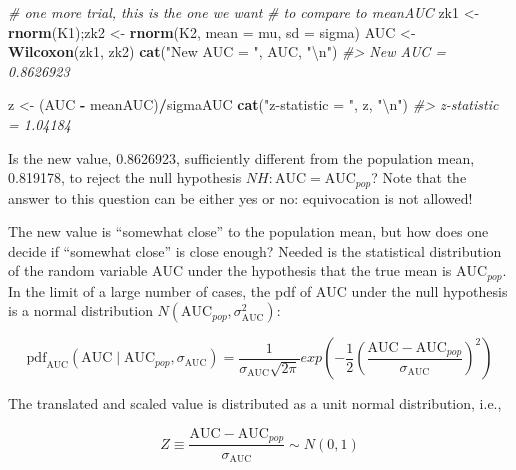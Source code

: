\documentclass[
]{book}
\newenvironment{Shaded}{\begin{snugshade}}{\end{snugshade}}
\newcommand{\CharTok}[1]{\textcolor[rgb]{0.31,0.60,0.02}{#1}}
\newcommand{\CommentTok}[1]{\textcolor[rgb]{0.56,0.35,0.01}{\textit{#1}}}
\newcommand{\DataTypeTok}[1]{\textcolor[rgb]{0.13,0.29,0.53}{#1}}
\newcommand{\KeywordTok}[1]{\textcolor[rgb]{0.13,0.29,0.53}{\textbf{#1}}}
\newcommand{\NormalTok}[1]{#1}
\newcommand{\OperatorTok}[1]{\textcolor[rgb]{0.81,0.36,0.00}{\textbf{#1}}}
\newcommand{\StringTok}[1]{\textcolor[rgb]{0.31,0.60,0.02}{#1}}
\begin{document}
\begin{Shaded}
\begin{Highlighting}[]
\CommentTok{# one more trial, this is the one we want }
\CommentTok{# to compare to meanAUC}
\NormalTok{zk1 <-}\StringTok{ }\KeywordTok{rnorm}\NormalTok{(K1);zk2 <-}\StringTok{ }\KeywordTok{rnorm}\NormalTok{(K2, }\DataTypeTok{mean =}\NormalTok{ mu, }\DataTypeTok{sd =}\NormalTok{ sigma) }
\NormalTok{AUC <-}\StringTok{ }\KeywordTok{Wilcoxon}\NormalTok{(zk1, zk2)}
\KeywordTok{cat}\NormalTok{(}\StringTok{"New AUC = "}\NormalTok{, AUC, }\StringTok{"}\CharTok{\textbackslash{}n}\StringTok{"}\NormalTok{)}
\CommentTok{#> New AUC =  0.8626923}

\NormalTok{z <-}\StringTok{ }\NormalTok{(AUC }\OperatorTok{-}\StringTok{ }\NormalTok{meanAUC)}\OperatorTok{/}\NormalTok{sigmaAUC}
\KeywordTok{cat}\NormalTok{(}\StringTok{"z-statistic = "}\NormalTok{, z, }\StringTok{"}\CharTok{\textbackslash{}n}\StringTok{"}\NormalTok{)}
\CommentTok{#> z-statistic =  1.04184}
\end{Highlighting}
\end{Shaded}

Is the new value, 0.8626923, sufficiently different from the population mean, 0.819178, to reject the null hypothesis \(NH: \text{AUC} = \text{AUC}_{pop}\)? Note that the answer to this question can be either yes or no: equivocation is not allowed!

The new value is ``somewhat close'' to the population mean, but how does one decide if ``somewhat close'' is close enough? Needed is the statistical distribution of the random variable \(\text{AUC}\) under the hypothesis that the true mean is \(\text{AUC}_{pop}\). In the limit of a large number of cases, the pdf of \(\text{AUC}\) under the null hypothesis is a normal distribution \(N\left ( \text{AUC}_{pop}, \sigma_{\text{AUC}}^{2} \right )\):

\begin{equation*} 
\text{pdf}_{\text{AUC}}\left ( \text{AUC}\mid \text{AUC}_{pop}, \sigma_{\text{AUC}} \right )=\frac{1}{\sigma_{\text{AUC}}\sqrt{2\pi}}exp\left ( -\frac{1}{2} \left ( \frac{\text{AUC}-\text{AUC}_{pop}}{\sigma_{\text{AUC}}} \right )^2\right )
\end{equation*}

The translated and scaled value is distributed as a unit normal distribution, i.e.,

\begin{equation*} 
Z \equiv \frac{\text{AUC}-\text{AUC}_{pop}}{\sigma_{\text{AUC}}}\sim N\left ( 0,1 \right )
\end{equation*}
\end{document}
